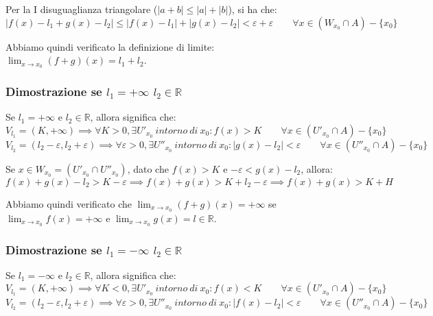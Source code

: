 \documentclass{article}
\begin{document}
\noindent Per la I disuguaglianza triangolare ($|a + b| \leq |a| + |b|$), si ha che:
\begin{equation*}
    |f(x) - l_1 + g(x) - l_2| \leq |f(x) - l_1| + |g(x) - l_2| < \varepsilon + \varepsilon \qquad \forall x \in (W_{x_0} \cap A) - \{x_0\}
\end{equation*}

\noindent Abbiamo quindi verificato la definizione di limite: $\lim_{x \to x_0} (f+g)(x) = l_1 + l_2$.

\subsubsection{Dimostrazione se $l_1 = +\infty$ $l_2 \in \mathbb{R}$}
Se $l_1 = +\infty$ e $l_2 \in \mathbb{R}$, allora significa che: 
\begin{equation*}
    V_{l_1} = (K, + \infty) \implies \forall K > 0, \exists U'_{x_0} \ intorno \ di \ x_0 : f(x) > K \qquad \forall x \in (U'_{x_0} \cap A) - \{x_0\}
\end{equation*}
\begin{equation*}
    V_{l_2} = (l_2 - \varepsilon, l_2 + \varepsilon) \implies \forall \varepsilon > 0, \exists U''_{x_0} \ intorno \ di \ x_0 : |g(x) - l_2| < \varepsilon \qquad \forall x \in (U''_{x_0} \cap A) - \{x_0\}
\end{equation*}

\noindent Se $x \in W_{x_0} = (U'_{x_0} \cap U''_{x_0})$, dato che $f(x) > K$ e $-\varepsilon < g(x) - l_2$, allora:
\begin{equation*}
    f(x) + g(x) - l_2 > K - \varepsilon \implies f(x) + g(x) > K + l_2 - \varepsilon \implies f(x) + g(x) > K + H
\end{equation*}

\noindent Abbiamo quindi verificato che $\lim_{x \to x_0} (f + g)(x) = +\infty$ se $\lim_{x \to x_0} f(x) = +\infty$ e $\lim_{x \to x_0} g(x) = l \in \mathbb{R}$.

\subsubsection{Dimostrazione se $l_1 = -\infty$ $l_2 \in \mathbb{R}$}
Se $l_1 = -\infty$ e $l_2 \in \mathbb{R}$, allora significa che: 
\begin{equation*}
    V_{l_1} = (K, + \infty) \implies \forall K < 0, \exists U'_{x_0} \ intorno \ di \ x_0 : f(x) < K \qquad \forall x \in (U'_{x_0} \cap A) - \{x_0\}
\end{equation*}
\begin{equation*}
    V_{l_2} = (l_2 - \varepsilon, l_2 + \varepsilon) \implies \forall \varepsilon > 0, \exists U''_{x_0} \ intorno \ di \ x_0 : |f(x) - l_2| < \varepsilon \qquad \forall x \in (U''_{x_0} \cap A) - \{x_0\}
\end{equation*}
\end{document}
